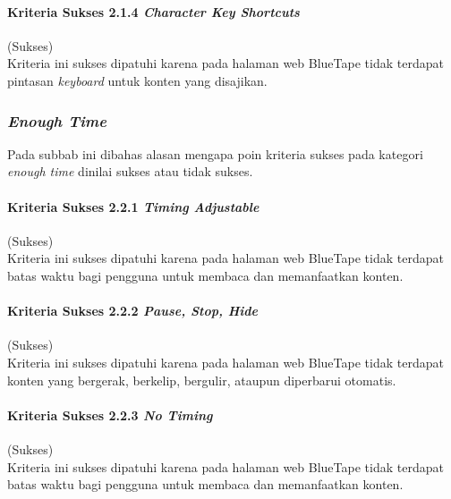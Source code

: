 \paragraph{Kriteria Sukses 2.1.4 \textit{Character Key Shortcuts}}
\label{par:kepatuhan_bluetape_kriteria_sukses_2.1.4}
(Sukses)\\

Kriteria ini sukses dipatuhi karena pada halaman web BlueTape tidak terdapat pintasan \textit{keyboard} untuk konten yang disajikan.

\subsubsection{\textit{Enough Time}}
\label{subsubsec:kepatuhan_bluetape_enough_time}
Pada subbab ini dibahas alasan mengapa poin kriteria sukses pada kategori \textit{enough time} dinilai sukses atau tidak sukses.

\paragraph{Kriteria Sukses 2.2.1 \textit{Timing Adjustable}}
\label{par:kepatuhan_bluetape_kriteria_sukses_2.2.1}
(Sukses)\\

Kriteria ini sukses dipatuhi karena pada halaman web BlueTape tidak terdapat batas waktu bagi pengguna untuk membaca dan memanfaatkan konten.

\paragraph{Kriteria Sukses 2.2.2 \textit{Pause, Stop, Hide}}
\label{par:kepatuhan_bluetape_kriteria_sukses_2.2.2}
(Sukses)\\

Kriteria ini sukses dipatuhi karena pada halaman web BlueTape tidak terdapat konten yang bergerak, berkelip, bergulir, ataupun diperbarui otomatis.

\paragraph{Kriteria Sukses 2.2.3 \textit{No Timing}}
\label{par:kepatuhan_bluetape_kriteria_sukses_2.2.3}
(Sukses)\\

Kriteria ini sukses dipatuhi karena pada halaman web BlueTape tidak terdapat batas waktu bagi pengguna untuk membaca dan memanfaatkan konten.

